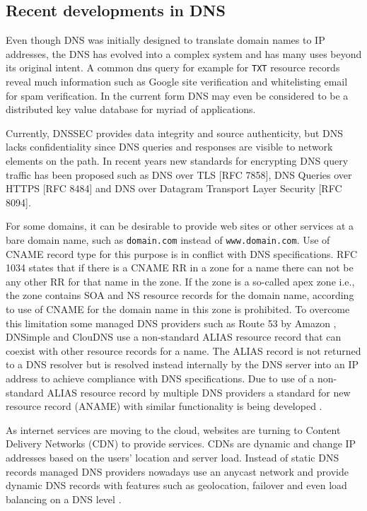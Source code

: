 \subsection{Recent developments in DNS}

Even though DNS was initially designed to translate domain names to IP addresses, the DNS has evolved into a complex system and has many uses beyond its original intent. A common dns query for example for \texttt{TXT} resource records reveal much information such as Google site verification and whitelisting email for spam verification. In the current form DNS may even be considered to be a distributed key value database for myriad of applications.

Currently, DNSSEC provides data integrity and source authenticity, but DNS lacks confidentiality since DNS queries and responses are visible to network elements on the path. In recent years new standards for encrypting DNS query traffic has been proposed such as DNS over TLS [RFC 7858], DNS Queries over HTTPS [RFC 8484] and DNS over Datagram Transport Layer Security [RFC 8094]. 

For some domains, it can be desirable to provide web sites or other services at a bare domain name, such as \texttt{domain.com} instead of \texttt{www.domain.com}. Use of CNAME record type for this purpose is in conflict with DNS specifications. RFC 1034 \cite{RFC1034} states that if there is a CNAME RR in a zone for a name there can not be any other RR for that name in the zone. If the zone is a so-called apex zone i.e., the zone contains SOA and NS resource records for the domain name, according to \cite{RFC1034} use of CNAME for the domain name in this zone is prohibited. To overcome this limitation some managed DNS providers such as Route 53 by Amazon \cite{Route53}, DNSimple \cite{DNSimple} and ClouDNS \cite{ClouDNS} use a non-standard ALIAS resource record that can coexist with other resource records for a name. The ALIAS record is not returned to a DNS resolver but is resolved instead internally by the DNS server into an IP address to achieve compliance with DNS specifications. Due to use of a non-standard ALIAS resource record by multiple DNS providers a standard for new resource record (ANAME) with similar functionality is being developed \cite{ANAME}.

As internet services are moving to the cloud, websites are turning to Content Delivery Networks (CDN) to provide services. CDNs are dynamic and change IP addresses based on the users' location and server load. Instead of static DNS records managed DNS providers nowadays use an anycast network and provide dynamic DNS records with features such as geolocation, failover and even load balancing on a DNS level \cite{ManagedDNS}.
